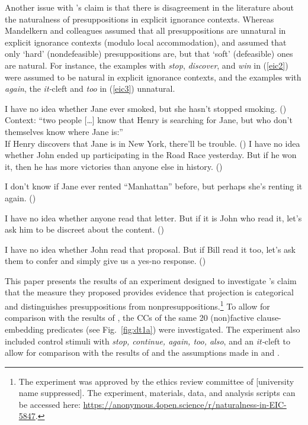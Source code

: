 \documentclass[11pt,fleqn]{article}
\def\verymarginal{{\leavevmode\llap{??}}}
\def\infelic{{\leavevmode\llap{\#}}}
\newcommand{\6}{\mbox{$[\hspace*{-.6mm}[$}}
\newcommand{\9}{\mbox{$]\hspace*{-.6mm}]$}}
\newcommand{\citepos}[1]{\citeauthor{#1}'s \citeyear{#1}}
\begin{document}
Another issue with \citepos{mandelkern-etal2020} claim is that there is disagreement in the literature about the naturalness of presuppositions in explicit ignorance contexts. Whereas Mandelkern and colleagues assumed that all presuppositions are unnatural in explicit ignorance contexts (modulo local accommodation), \citealt{simons01} and \citealt{abusch10} assumed that only `hard' (nondefeasible) presuppositions are, but that `soft' (defeasible) ones are natural. For instance,  the examples with {\em stop}, {\em discover}, and {\em win} in (\ref{eic2}) were assumed to be natural in explicit ignorance contexts, and the examples with {\em again}, the {\em it-}cleft and {\em too} in (\ref{eic3}) unnatural.

\begin{exe}
\ex\label{eic2}
\begin{xlist}
\ex I have no idea whether Jane ever smoked, but she hasn't stopped smoking. \hfill (\citealt[443]{simons01})
\ex Context: ``two people [\ldots] know that Henry is searching for Jane, but who don't themselves know where Jane is:'' \\ If Henry discovers that Jane is in New York, there'll be trouble. \hfill (\citealt[434]{simons01})
\ex I have no idea whether John ended up participating in the
Road Race yesterday. But if he won it, then he has more victories than anyone else in history. \hfill (\citealt[39]{abusch10})
\end{xlist}
\ex\label{eic3}
\begin{xlist}
\ex\infelic I don't know if Jane ever rented ``Manhattan'' before, but perhaps she's renting it again. \hfill (\citealt[443]{simons01})

\ex \verymarginal I have no idea whether anyone read that letter. But if it is John
who read it, let's ask him to be discreet about the content. \hfill (\citealt[40]{abusch10})

\ex \verymarginal I have no idea whether John read that proposal. But if Bill read it too, let's ask them to confer and simply give us a yes-no response. \hfill (\citealt[40]{abusch10})
\end{xlist}
\end{exe}

This paper presents the results of an experiment designed to investigate \citepos{mandelkern-etal2020} claim that the measure they proposed provides evidence that projection is categorical and distinguishes presuppositions from nonpresuppositions.\footnote{\label{f:github}The experiment was approved by the ethics review committee of [university name suppressed]. The experiment, materials, data, and analysis scripts can be accessed here:  \url{https://anonymous.4open.science/r/naturalness-in-EIC-5847}.}  To allow for comparison with the results of \citealt{degen-tonhauser-language}, the CCs of the same 20 (non)factive clause-embedding predicates (see Fig.~\ref{fig:dt1a}) were investigated. The experiment also included control stimuli with {\em stop, continue, again, too, also}, and an {\em it-}cleft to allow for comparison with the results of \citealt{mandelkern-etal2020} and the assumptions made in \citealt{simons01} and \citealt{abusch10}. 
\end{document}

